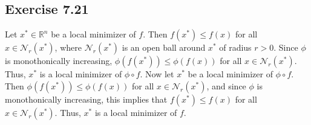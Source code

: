 \documentclass[11.5pt, letterpaper, bibtotoc,
    tablecaptionabove, figurecaptionabove]{article}
\begin{document}
\subsection*{Exercise 7.21}
Let $x^*\in\mathbb R^n$ be a local minimizer of $f$.
Then $f(x^*)\leq f(x)$ for all $x\in\mathcal N_r(x^*)$,
where $\mathcal N_r(x^*)$ is an open ball around $x^*$ of radius $r>0$.
Since $\phi$ is monothonically increasing, $\phi(f(x^*))\leq\phi(f(x))$ for all $x\in\mathcal N_r(x^*)$.
Thus, $x^*$ is a local minimizer of $\phi\circ f$.
Now let $x^*$ be a local minimizer of $\phi\circ f$.
Then $\phi(f(x^*))\leq\phi(f(x))$ for all $x\in\mathcal N_r(x^*)$,
and since $\phi$ is monothonically increasing, this implies that
$f(x^*)\leq f(x)$ for all $x\in\mathcal N_r(x^*)$.
Thus, $x^*$ is a local minimizer of $f$.
\end{document}
